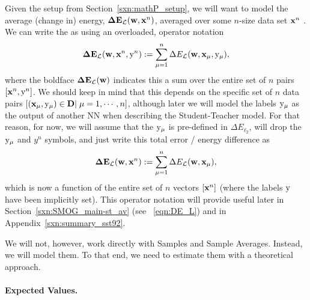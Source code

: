 Given the setup from Section~\ref{sxn:mathP_setup},
we will want to model the average (change in) energy,  $\mathbf{\Delta {E}}_{\mathcal{L}}(\mathbf{w}, \mathbf{x}^{n})$, averaged over some $n$-size data set $\mathbf{x}^{n}$ .
We can write the \TotalDataSampleError as
using an overloaded, operator notation 
\begin{align}
  \label{eqn:detopxy}
  \mathbf{\Delta {E}}_{\mathcal{L}}(\mathbf{w}, \mathbf{x}^{n}, \mathrm{y}^{n}) :=\sum_{\mu=1}^{n}\Delta E_{\mathcal{L}}({\mathbf{w}},{\mathbf{x}}_{\mu}, \mathrm{y}_{\mu})  ,
\end{align}
where the boldface $\mathbf{\Delta {E}}_{\mathcal{L}}(\mathbf{w})$ indicates this a sum over the entire set of  $n$ pairs $[\mathbf{x}^{n}, \mathrm{y}^{n}]$.
We should keep in mind that this depends on the specific set of $n$ data pairs
$[({\mathbf{x}}_{\mu},\mathrm{y}_{\mu})\in\mathbf{D}|\;\mu=1,\cdots,n]$, 
although later we will model the labels $\mathrm{y}_{\mu}$ as the output of another NN
when describing the Student-Teacher model.
%
For that reason, for now, we
will assume that the $\mathrm{y}_{\mu}$ is pre-defined in $\Delta E_{\ell_2}$,
will drop the $\mathrm{y}_{\mu}$ and $y^{n}$ symbols, 
and just write this total error / energy difference as
\begin{align}
  \label{eqn:detox}
  \mathbf{\Delta {E}}_{\mathcal{L}}(\mathbf{w}, \mathbf{x}^{n}) :=\sum_{\mu=1}^{n}\Delta E_{\mathcal{L}}({\mathbf{w}},{\mathbf{x}}_{\mu})  ,
\end{align}
which is now a function of the entire set of  $n$ vectors $[\mathbf{x}^{n}]$
(where the labels $\mathrm{y}$ have been implicitly set).
This operator notation will provide useful later in Section~\ref{sxn:SMOG_main-st_av}
(see \EQN~\ref{eqn:DE_L}) and in Appendix~\ref{sxn:summary_sst92}.

We will not, however,  work directly with Samples and Sample Averages.
Instead, we will model them.
To that end, we need to estimate them with a theoretical approach.


\paragraph{Expected Values.}

